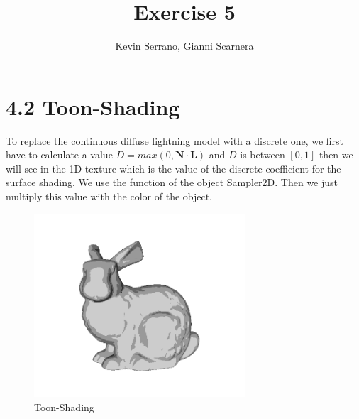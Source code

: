 \documentclass[10pt,a4paper]{report}
\author{Kevin Serrano, Gianni Scarnera}
\title{Exercise 5}
\begin{document}
\maketitle

\section*{4.2   Toon-Shading }
To replace the continuous diffuse lightning model with a discrete one, we first have to calculate a value $D = max(0,\mathbf{N \cdot L})$ and $D$ is between $[0,1]$ then we will see in the 1D texture which is the value of the discrete coefficient for the surface shading. We use the function of the object Sampler2D. Then we just multiply this value with the color of the object.
\begin{figure}[h!]
\caption{Toon-Shading}
  \centering
    \includegraphics[width=0.7\textwidth]{toonShading.png}
\end{figure}
\newpage
\end{document}

